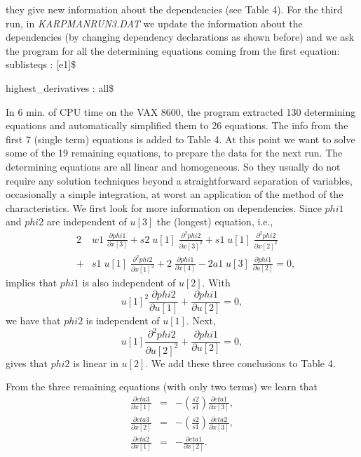 {they give new information about the dependencies (see Table 4).
\vskip 2pt
For the third run, in {\em KARPMANRUN3.DAT} we
update the information about the dependencies 
(by changing dependency declarations as shown before) 
and we ask the program for all the determining equations coming from 
the first equation: 
\vskip 2pt
sublisteqs : [e1]\$ \par
highest\_derivatives : all\$ \par
\vskip 2pt
\noindent
In 6 min. of CPU time on the VAX 8600, the program extracted 130 determining 
equations and automatically simplified them to 26 equations.
The info from the first 7 (single term) equations is added to Table 4.
\nopagebreak
At this point we want to solve some of the 19 remaining equations, 
to prepare the data for the next run. 
\nopagebreak
The determining equations are all linear and homogeneous. So they 
usually do not require any solution techniques beyond a straightforward 
separation of variables, occasionally a simple integration,
at worst an application of the method of the characteristics.
\nopagebreak
We first look for more information on dependencies.
Since $phi1$ and $phi2$ are independent of $u[3]$ the (longest) equation, i.e.,
\begin{eqnarray}
&2&\!\!\! w1 \; \frac{\partial phi1}{\partial x[3]} 
+ s2 \; u[1] \; \frac{\partial^2 phi2}{\partial x[3]^2} 
+ s1 \; u[1] \; \frac{\partial^2 phi2}{\partial x[2]^2} \nonumber \\
&+&\!\!\! s1 \; u[1] \; \frac{\partial^2 phi2}{\partial x[1]^2} 
+ 2 \; \frac{\partial phi1}{\partial x[4]} 
- 2 a1 \; u[3] \; \frac{\partial phi1}{\partial u[2]} = 0, 
\label{eqdphi1du2}
\end{eqnarray}
implies that $phi1$ is also independent of $u[2]$.
With
\begin{equation}
u[1]^2 \frac{\partial phi2}{\partial u[1]} 
+ \frac{\partial phi1}{\partial u[2]} = 0,
\label{eqdphi2du1}
\end{equation}
we have that $phi2$ is independent of $u[1]$. 
\vskip 1pt
\pagebreak
\noindent
Next,
\begin{equation}
u[1] \frac{\partial^2 phi2}{\partial u[2]^2} 
+ \frac{\partial phi1}{\partial u[2]} = 0,
\label{phi2linear}
\end{equation}
gives that $phi2$ is linear in $u[2]$. We add these three conclusions 
to Table 4.

\nopagebreak
From the three remaining equations (with only two terms) we learn that
\begin{eqnarray}
\frac{\partial eta3}{\partial x[1]}& = & - 
\left( \frac{s2}{s1} \right) \frac{\partial eta1}{\partial x[3]},
\label{grad1} \\
\frac{\partial eta3}{\partial x[2]}& = & 
-\left( \frac{s2}{s1} \right) \frac{\partial eta2}{\partial x[3]},
\label{grad2} \\
\frac{\partial eta2}{\partial x[1]} & =& -\frac{\partial eta1}{\partial x[2]}. 
\label{grad3} \\ \nonumber
\end{eqnarray}

}
